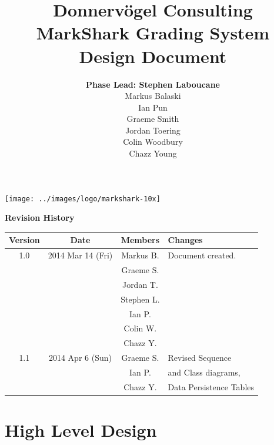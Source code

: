 \documentclass{article}
\begin{document}
\title{Donnervögel Consulting \\ MarkShark Grading System \\ Design Document}
\author{\textbf{Phase Lead: Stephen Laboucane} \\ Markus Balaski \\ Ian Pun \\
  Graeme Smith \\ Jordan Toering \\  Colin Woodbury \\ Chazz Young}
\maketitle
\centerline{\texttt{[image: ../images/logo/markshark-10x]}}
\clearpage

\textbf{Revision History}
\begin{center}
  \begin{tabular}{| c | c | c | l |}
    \hline
    Version & Date & Members & Changes\\
    \hline
    1.0 & 2014 Mar 14 (Fri) & Markus B. & Document created.\\
    & & Graeme S. & \\
    & & Jordan T. & \\
    & & Stephen L. & \\
    & & Ian P. & \\
    & & Colin W. & \\
    & & Chazz Y. & \\
    \hline
    1.1 & 2014 Apr 6 (Sun) & Graeme S. & Revised Sequence\\
    & & Ian P. & and Class diagrams,\\
    & & Chazz Y. & Data Persistence Tables\\
    \hline
  \end{tabular}
\end{center}
\clearpage

\tableofcontents
\clearpage

\section{High Level Design}
\end{document}
